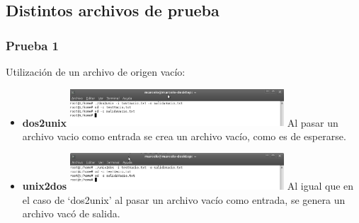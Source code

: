 \documentclass[a4paper,10pt]{article}
\begin{document}
  \subsection{Distintos archivos de prueba}
    \subsubsection{Prueba 1}
    Utilizaci\'on de un archivo de origen vac\'io:
      \begin{itemize}
      \item \textbf{dos2unix}
      \newline
      \includegraphics[width=8cm, viewport=0 0 896 156]{../Informe/Imagenes/prueba1-archivo-dos2unix.png}
      \newline	
      Al pasar un archivo vacio como entrada se crea un archivo vac\'io, como es de esperarse.
      \item \textbf{unix2dos}
      \newline
      \includegraphics[width=8cm, viewport=0 0 898 153]{../Informe/Imagenes/prueba1-archivo-unix2dos.png}	
      \newline
      Al igual que en el caso de `dos2unix' al pasar un archivo vac\'io como entrada, se genera un archivo vac\'o de salida.
      
      \end{itemize}
\end{document}
